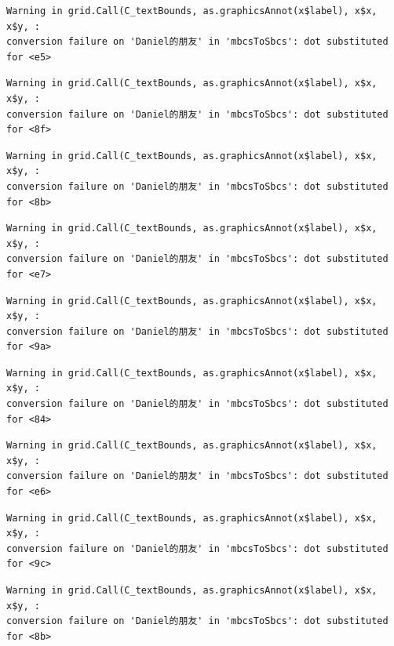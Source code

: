 \documentclass[
  letterpaper,
  DIV=11,
  numbers=noendperiod]{scrreprt}
\begin{document}
\begin{verbatim}
Warning in grid.Call(C_textBounds, as.graphicsAnnot(x$label), x$x, x$y, :
conversion failure on 'Daniel的朋友' in 'mbcsToSbcs': dot substituted for <e5>
\end{verbatim}

\begin{verbatim}
Warning in grid.Call(C_textBounds, as.graphicsAnnot(x$label), x$x, x$y, :
conversion failure on 'Daniel的朋友' in 'mbcsToSbcs': dot substituted for <8f>
\end{verbatim}

\begin{verbatim}
Warning in grid.Call(C_textBounds, as.graphicsAnnot(x$label), x$x, x$y, :
conversion failure on 'Daniel的朋友' in 'mbcsToSbcs': dot substituted for <8b>
\end{verbatim}

\begin{verbatim}
Warning in grid.Call(C_textBounds, as.graphicsAnnot(x$label), x$x, x$y, :
conversion failure on 'Daniel的朋友' in 'mbcsToSbcs': dot substituted for <e7>
\end{verbatim}

\begin{verbatim}
Warning in grid.Call(C_textBounds, as.graphicsAnnot(x$label), x$x, x$y, :
conversion failure on 'Daniel的朋友' in 'mbcsToSbcs': dot substituted for <9a>
\end{verbatim}

\begin{verbatim}
Warning in grid.Call(C_textBounds, as.graphicsAnnot(x$label), x$x, x$y, :
conversion failure on 'Daniel的朋友' in 'mbcsToSbcs': dot substituted for <84>
\end{verbatim}

\begin{verbatim}
Warning in grid.Call(C_textBounds, as.graphicsAnnot(x$label), x$x, x$y, :
conversion failure on 'Daniel的朋友' in 'mbcsToSbcs': dot substituted for <e6>
\end{verbatim}

\begin{verbatim}
Warning in grid.Call(C_textBounds, as.graphicsAnnot(x$label), x$x, x$y, :
conversion failure on 'Daniel的朋友' in 'mbcsToSbcs': dot substituted for <9c>
\end{verbatim}

\begin{verbatim}
Warning in grid.Call(C_textBounds, as.graphicsAnnot(x$label), x$x, x$y, :
conversion failure on 'Daniel的朋友' in 'mbcsToSbcs': dot substituted for <8b>
\end{verbatim}
\end{document}
